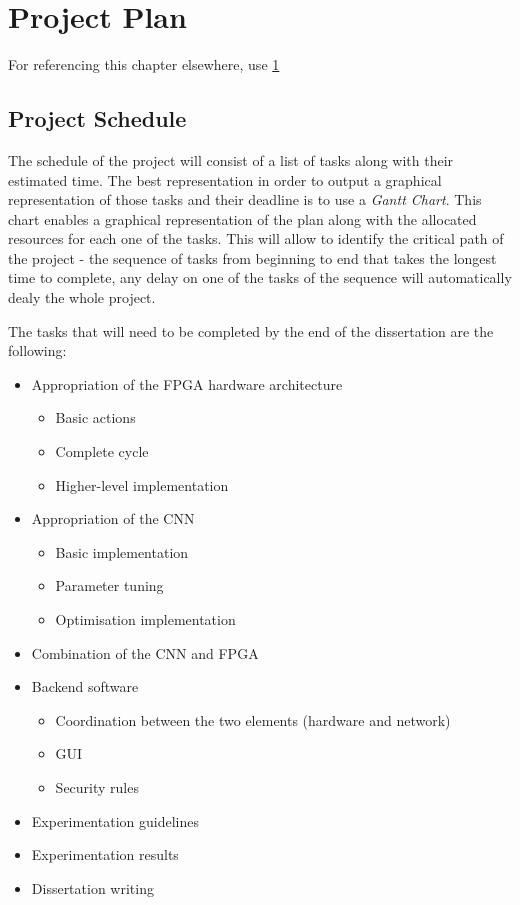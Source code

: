 \chapter{Project Plan}

\label{Chapter5} For referencing this chapter elsewhere, use \ref{Chapter5}



\section{Project Schedule}

The schedule of the project will consist of a list of tasks along with their estimated time. The best representation in order to output a graphical representation of those tasks and their deadline is to use a \emph{Gantt Chart}. This chart enables a graphical representation of the plan along with the allocated resources for each one of the tasks. This will allow to identify the critical path of the project - the sequence of tasks from beginning to end that takes the longest time to complete, any delay on one of the tasks of the sequence will automatically dealy the whole project.

The tasks that will need to be completed by the end of the dissertation are the following:

\begin{itemize}
  \item Appropriation of the FPGA hardware architecture
  \begin{itemize}
    \item Basic actions
    \item Complete cycle
    \item Higher-level implementation
  \end{itemize}
  \item Appropriation of the CNN
  \begin{itemize}
    \item Basic implementation
    \item Parameter tuning
    \item Optimisation implementation
  \end{itemize}
  \item Combination of the CNN and FPGA
  \item Backend software
  \begin{itemize}
    \item Coordination between the two elements (hardware and network)
    \item GUI
    \item Security rules
  \end{itemize}
  \item Experimentation guidelines
  \item Experimentation results
  \item Dissertation writing
\end{itemize}

